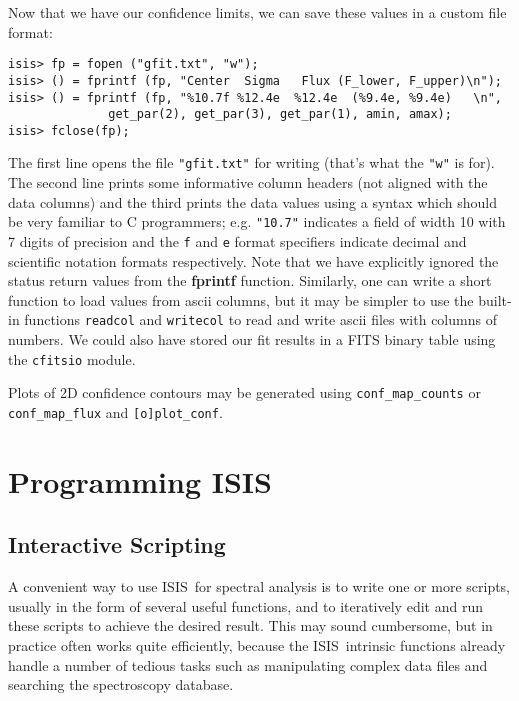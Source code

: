 \documentclass{book}
\newcommand{\isisx}{{\sc ISIS~}}
\begin{document}
{Now that we have our confidence limits, we can save these values
in a custom file format:
\begin{verbatim}
isis> fp = fopen ("gfit.txt", "w");
isis> () = fprintf (fp, "Center  Sigma   Flux (F_lower, F_upper)\n");
isis> () = fprintf (fp, "%10.7f %12.4e  %12.4e  (%9.4e, %9.4e)   \n",
              get_par(2), get_par(3), get_par(1), amin, amax);
isis> fclose(fp);
\end{verbatim}
The first line opens the file {\tt "gfit.txt"} for writing (that's
what the {\tt "w"} is for). The second line prints some
informative column headers (not aligned with the data columns) and
the third prints the data values using a syntax which should be
very familiar to C programmers; e.g. \verb|"10.7"| indicates a
field of width 10 with 7 digits of precision and the {\tt f} and
{\tt e} format specifiers indicate decimal and scientific notation
formats respectively.  Note that we have explicitly ignored the
status return values from the {\bf fprintf} function. Similarly,
one can write a short function to load values from ascii columns,
but it may be simpler to use the built-in functions \verb|readcol|
and \verb|writecol| to read and write ascii files with columns of
numbers. We could also have stored our fit results in a FITS
binary table using the \verb|cfitsio| module.\footnotemark


Plots of 2D confidence contours may be generated using
\verb|conf_map_counts| or \verb|conf_map_flux| and
\verb|[o]plot_conf|.

\chapter{Programming ISIS}
\label{chap:prog}

\section{Interactive Scripting}

A convenient way to use \isisx for spectral analysis is to write one or more
scripts, usually in the form of several useful functions, and to iteratively
edit and run these scripts to achieve the desired result. This may sound
cumbersome, but in practice often works quite efficiently, because the
\isisx intrinsic functions already handle a number of tedious tasks such as
manipulating complex data files and searching the spectroscopy database.

}
\end{document}
